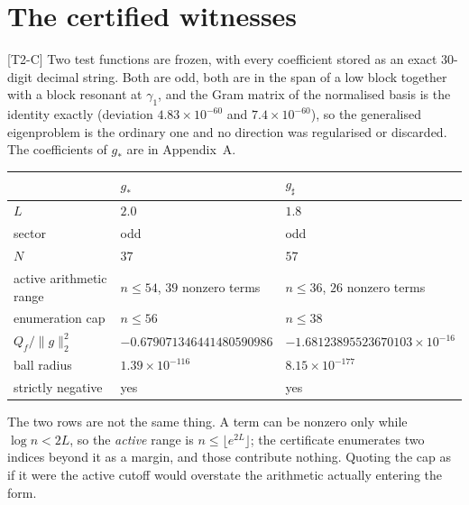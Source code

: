 \documentclass[11pt,a4paper]{article}
\theoremstyle{definition}
\theoremstyle{remark}
\newcommand{\tier}[1]{{\small\textsf{[#1]}}}
\begin{document}
\section{The certified witnesses}\label{sec:witness}

\tier{T2-C} Two test functions are frozen, with every coefficient stored as an exact
$30$-digit decimal string. Both are odd, both are in the span of a low block together
with a block resonant at $\gamma_1$, and the Gram matrix of the normalised basis is the
identity exactly (deviation $4.83\times10^{-60}$ and $7.4\times10^{-60}$), so the
generalised eigenproblem is the ordinary one and no direction was regularised or
discarded. The coefficients of $g_*$ are in Appendix~A.

\begin{center}
\begin{tabular}{@{}lll@{}}
\toprule
& $g_*$ & $g_\sharp$ \\
\midrule
$L$ & $2.0$ & $1.8$ \\
sector & odd & odd \\
$N$ & $37$ & $57$ \\
active arithmetic range & $n\le54$, $39$ nonzero terms & $n\le36$, $26$ nonzero terms \\
enumeration cap & $n\le56$ & $n\le38$ \\[2pt]
$Q_f/\|g\|_2^2$ & $-0.679071346441480590986$ & $-1.68123895523670103\times10^{-16}$ \\
ball radius & $1.39\times10^{-116}$ & $8.15\times10^{-177}$ \\
strictly negative & yes & yes \\
\bottomrule
\end{tabular}
\end{center}

\noindent The two rows are not the same thing. A term can be nonzero only while
$\log n < 2L$, so the \emph{active} range is $n \le \lfloor e^{2L}\rfloor$; the
certificate enumerates two indices beyond it as a margin, and those contribute nothing.
Quoting the cap as if it were the active cutoff would overstate the arithmetic actually
entering the form.
\end{document}
